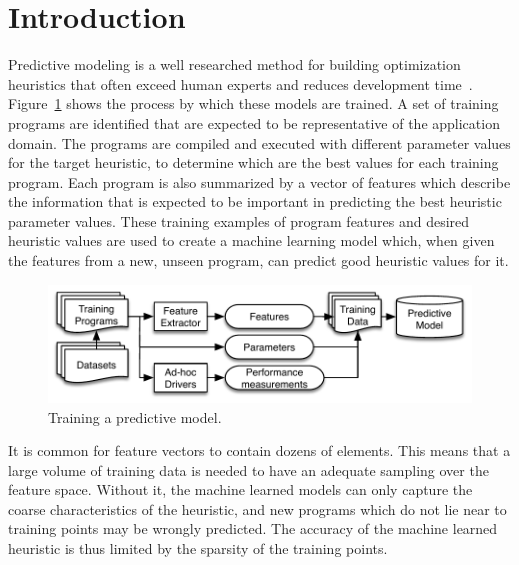 \section{Introduction}

Predictive modeling is a well researched method for building optimization heuristics that often exceed human experts and reduces development time~\cite{Micolet2016,Wang2014c,Magni2014,Cummins2016,Wang2009,Wen2015,Wang2010,Falch2015,Collins2012,Leather2014,Ogilvie2014a}. Figure~\ref{fig:training-a-predictive-model} shows the process by which these models are trained. A set of training programs are identified that are expected to be representative of the application domain. The programs are compiled and executed with different parameter values for the target heuristic, to determine which are the best values for each training program. Each program is also summarized by a vector of features which describe the information that is expected to be important in predicting the best heuristic parameter values. These training examples of program features and desired heuristic values are used to create a machine learning model which, when given the features from a new, unseen program, can predict good heuristic values for it.

\begin{figure}
  \includegraphics[width=\columnwidth]{img/overview-a}%
  \caption{Training a predictive model.}%
  \label{fig:training-a-predictive-model}
\end{figure}

It is common for feature vectors to contain dozens of elements. This means that a large volume of training data is needed to have an adequate sampling over the feature space. Without it, the machine learned models can only capture the coarse characteristics of the heuristic, and new programs which do not lie near to training points may be wrongly predicted. The accuracy of the machine learned heuristic is thus limited by the sparsity of the training points.

